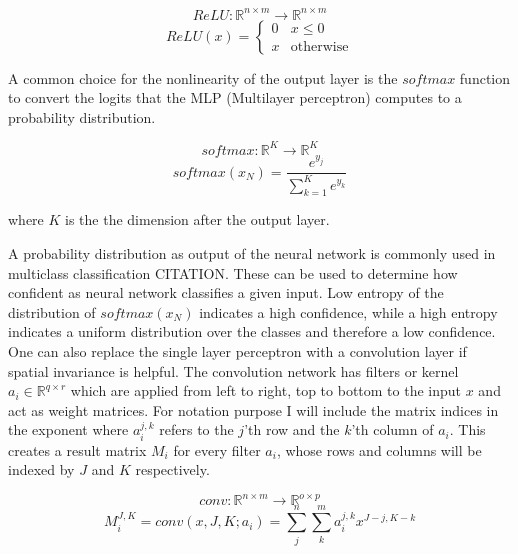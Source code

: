 \documentclass{article}
\begin{document}
\begin{equation}
    ReLU: \mathbb{R}^{n \times m} \xrightarrow{} \mathbb{R}^{n \times m}
\end{equation}
\begin{equation*}
    ReLU(x)=
        \begin{cases}
            0 &x\leq 0 \\
            x&\text{otherwise}
        \end{cases}
\end{equation*}

\noindent A common choice for the nonlinearity of the output layer is the $softmax$ function  to convert the 
logits that the MLP (Multilayer perceptron) computes to a probability distribution. 


\begin{equation}
    softmax: \mathbb{R}^K \xrightarrow{} \mathbb{R}^K
\end{equation}
\begin{equation*}
    softmax(x_N) = \frac{e^{y_j}}{\sum_{k=1}^K e^{y_k}}
\end{equation*}

where $K$ is the the dimension after the output layer.

\noindent A probability distribution as output of the neural network is commonly used in multiclass classification CITATION.
These can be used to determine how confident as neural network classifies a given input.
Low entropy of the distribution of $softmax(x_N)$ indicates a high confidence, while a high entropy
indicates a uniform distribution over the classes and therefore a low confidence.\\

\noindent One can also replace the single layer perceptron with a convolution layer if spatial invariance is helpful. The convolution network
has filters or kernel $a_i \in \mathbb{R}^{q \times r}$ which are applied from left to right, top to bottom
to the input $x$ and act as weight matrices. For notation purpose I will include the matrix indices in the exponent where $a_i^{j,k}$ refers
to the $j$'th row and the $k$'th column of $a_i$. This creates a result matrix $M_i$ for every filter $a_i$, whose rows and columns
will be indexed by $J$ and $K$ respectively.

\begin{equation}
    conv: \mathbb{R}^{n \times m} \xrightarrow{} \mathbb{R}^{o \times p}
\end{equation}
\begin{equation*}
    M_i^{J, K} = conv(x, J, K; a_i) = \sum_j^n \sum_k^m a_i^{j,k} x^{J - j, K - k}
\end{equation*}
\end{document}
